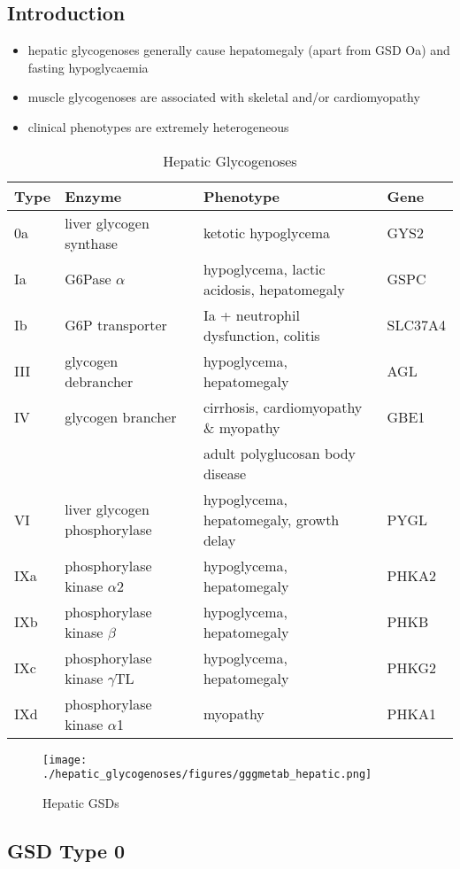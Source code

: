 \documentclass{scrartcl}
\begin{document}
\subsection{Introduction}
\label{sec:org9ae11a4}
\begin{itemize}
\item hepatic glycogenoses generally cause hepatomegaly (apart from GSD
Oa) and fasting hypoglycaemia
\item muscle glycogenoses are associated with skeletal and/or
cardiomyopathy
\item clinical phenotypes are extremely heterogeneous
\end{itemize}
\begin{table}[htbp]
\caption{\label{tab:org9e8efd9}
Hepatic Glycogenoses}
\centering
\begin{tabular}{llll}
Type & Enzyme & Phenotype & Gene\\
\hline
0a & liver glycogen synthase & ketotic hypoglycema & GYS2\\
Ia & G6Pase \(\alpha\) & hypoglycema, lactic acidosis, hepatomegaly & GSPC\\
Ib & G6P transporter & Ia + neutrophil dysfunction, colitis & SLC37A4\\
III & glycogen debrancher & hypoglycema, hepatomegaly & AGL\\
IV & glycogen brancher & cirrhosis, cardiomyopathy \& myopathy & GBE1\\
 &  & adult polyglucosan body disease & \\
VI & liver glycogen phosphorylase & hypoglycema, hepatomegaly, growth delay & PYGL\\
\hline
IXa & phosphorylase kinase \(\alpha\)2 & hypoglycema, hepatomegaly & PHKA2\\
IXb & phosphorylase kinase \(\beta\) & hypoglycema, hepatomegaly & PHKB\\
IXc & phosphorylase kinase \(\gamma\)TL & hypoglycema, hepatomegaly & PHKG2\\
IXd & phosphorylase kinase \(\alpha\)1 & myopathy & PHKA1\\
\end{tabular}
\end{table}

\begin{figure}[htbp]
\centering
\texttt{[image: ./hepatic\_glycogenoses/figures/gggmetab\_hepatic.png]}
\caption{\label{fig:org02998aa}
Hepatic GSDs}
\end{figure}

\subsection{GSD Type 0}
\label{sec:org8335f7f}
\end{document}
